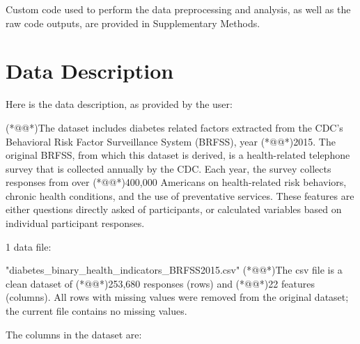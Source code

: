 \documentclass[11pt]{article}
\begin{document}
Custom code used to perform the data preprocessing and analysis, as well as the raw code outputs, are provided in Supplementary Methods.






\clearpage
\appendix

\section{Data Description} \label{sec:data_description} Here is the data description, as provided by the user:

\begin{codeoutput}
(*@@*)The dataset includes diabetes related factors extracted from the CDC's Behavioral Risk Factor Surveillance System (BRFSS), year (*@@*)2015.
The original BRFSS, from which this dataset is derived, is a health-related telephone survey that is collected annually by the CDC.
Each year, the survey collects responses from over (*@@*)400,000 Americans on health-related risk behaviors, chronic health conditions, and the use of preventative services. These features are either questions directly asked of participants, or calculated variables based on individual participant responses.


1 data file:

"diabetes_binary_health_indicators_BRFSS2015.csv"
(*@@*)The csv file is a clean dataset of (*@@*)253,680 responses (rows) and (*@@*)22 features (columns).
All rows with missing values were removed from the original dataset; the current file contains no missing values.

The columns in the dataset are:


\end{codeoutput}
\end{document}
